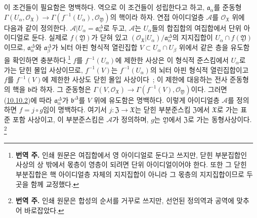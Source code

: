 이 조건들이 필요함은 명백하다. 역으로 이 조건들이 성립한다고 하고,
$\mathfrak{a}_\alpha$를 준동형
$\Gamma(U_\alpha,\mathscr{O}_{\mathfrak{X}})\to
\Gamma(f^{-1}(U_\alpha),\mathscr{O}_{\mathfrak{Y}})$의 핵이라 하자.
연접 아이디얼층 $\mathscr{A}$를 $\mathscr{O}_{\mathfrak{X}}$ 위에
다음과 같이 정의한다. $\mathscr{A}|U_\alpha=\mathfrak{a}_\alpha^\Delta$로
두고, $\mathscr{A}$는 $U_\alpha$들의 합집합의 여집합에서 단위
아이디얼로 둔다. 실제로 $f(\mathfrak{Y})$가 닫혀 있고
$(\mathscr{O}_{\mathfrak{X}}|U_\alpha)/\mathfrak{a}_\alpha^\Delta$의
지지집합이 $U_\alpha\cap f(\mathfrak{Y})$이므로,
$\mathfrak{a}_\alpha^\Delta$와 $\mathfrak{a}_\beta^\Delta$가 뇌터
아핀 형식적 열린집합 $V\subset U_\alpha\cap U_\beta$ 위에서 같은
층을 유도함을 확인하면 충분하다.\footnote{\textbf{번역 주.} 인쇄
원문은 여집합에서 영 아이디얼로 둔다고 쓰지만, 닫힌 부분집합인
사상의 상 밖에서 몫층이 영층이 되려면 단위 아이디얼이어야 한다.
또한 그 닫힌 부분집합은 핵 아이디얼층 자체의 지지집합이 아니라 그
몫층의 지지집합이므로 두 곳을 함께 교정했다.}
$f$를 $f^{-1}(U_\alpha)$에 제한한 사상은 이 형식적 준스킴에서
$U_\alpha$로 가는 닫힌 몰입 사상이므로, $f^{-1}(V)$는
$f^{-1}(U_\alpha)$의 뇌터 아핀 형식적 열린집합이고 $f$를
$f^{-1}(V)$에 제한한 사상도 닫힌 몰입 사상이다~; 이 제한에 대응하는
전사 준동형의 핵을 $\mathfrak{b}$라 하자. 그 준동형은
$\Gamma(V,\mathscr{O}_{\mathfrak{X}})\to
\Gamma(f^{-1}(V),\mathscr{O}_{\mathfrak{Y}})$이다. 그러면
(\hyperref[I.10.10.2-ko]{10.10.2})에 따라
$\mathfrak{a}_\alpha^\Delta$가 $\mathfrak{b}^\Delta$를 $V$ 위에
유도함은 명백하다. 이렇게 아이디얼층 $\mathscr{A}$를 정의하면
$f=j\circ g$임이 명백하다. 여기서
$j:\mathfrak{Z}\to\mathfrak{X}$는 닫힌 부분준스킴 $\mathfrak{Z}$에서
$\mathfrak{X}$로 가는 표준 포함 사상이고, 이 부분준스킴은
$\mathscr{A}$가 정의하며,
$g$는 $\mathfrak{Y}$에서 $\mathfrak{Z}$로 가는 동형사상이다.
\footnote{\textbf{번역 주.} 인쇄 원문은 합성의 순서를 거꾸로 쓰지만,
선언된 정의역과 공역에 맞추어 바로잡았다.}

